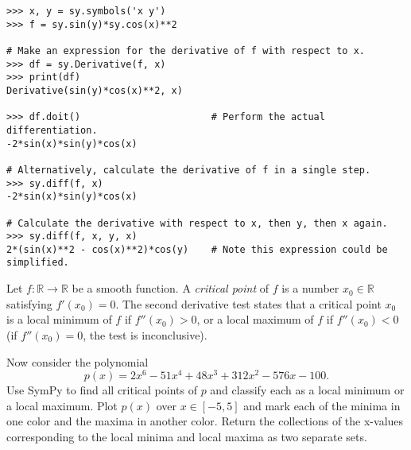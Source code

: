 \begin{lstlisting}
>>> x, y = sy.symbols('x y')
>>> f = sy.sin(y)*sy.cos(x)**2

# Make an expression for the derivative of f with respect to x.
>>> df = sy.Derivative(f, x)
>>> print(df)
Derivative(sin(y)*cos(x)**2, x)

>>> df.doit()                       # Perform the actual differentiation.
-2*sin(x)*sin(y)*cos(x)

# Alternatively, calculate the derivative of f in a single step.
>>> sy.diff(f, x)
-2*sin(x)*sin(y)*cos(x)

# Calculate the derivative with respect to x, then y, then x again.
>>> sy.diff(f, x, y, x)
2*(sin(x)**2 - cos(x)**2)*cos(y)    # Note this expression could be simplified.
\end{lstlisting}

\begin{problem} %
Let $f:\mathbb{R}\rightarrow\mathbb{R}$ be a smooth function.
A \emph{critical point} of $f$ is a number $x_0\in\mathbb{R}$ satisfying $f'(x_0) = 0$.
The second derivative test states that a critical point $x_0$ is a local minimum of $f$ if $f''(x_0) > 0$, or a local maximum of $f$ if $f''(x_0) < 0$ (if $f''(x_0) = 0$, the test is inconclusive).

Now consider the polynomial
\[
p(x) = 2x^6 - 51x^4 + 48x^3 + 312x^2 - 576x - 100.
\]
Use SymPy to find all critical points of $p$ and classify each as a local minimum or a local maximum.
Plot $p(x)$ over $x\in[-5,5]$ and mark each of the minima in one color and the maxima in another color.
Return the collections of the x-values corresponding to the local minima and local maxima as two separate sets.
\end{problem}

